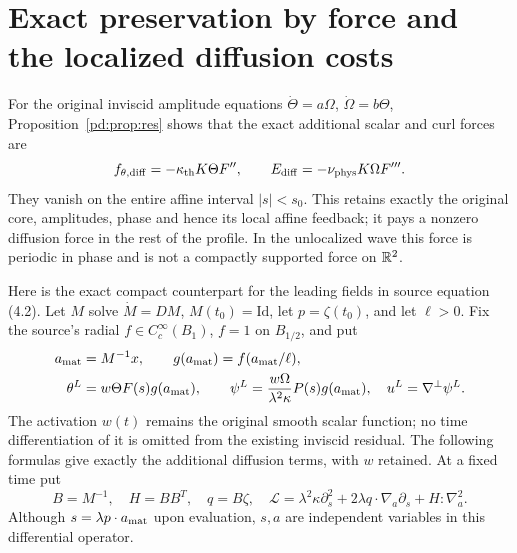 \section{Exact preservation by force and the localized diffusion costs}

For the original inviscid amplitude equations $\dot\Theta=a\Omega$,
$\dot\Omega=b\Theta$, Proposition~\ref{pd:prop:res} shows that the exact
additional scalar and curl forces are
\begin{equation}\label{pd:eq:repair}
 f_{\theta,\mathrm{diff}}=-\kappa_{\rm th} K\Theta F'',\qquad
 E_{\mathrm{diff}}=-\nu_{\rm phys} K\Omega F'''.
\end{equation}
They vanish on the entire affine interval $|s|<s_0$. This retains exactly
the original core, amplitudes, phase and hence its local affine feedback;
it pays a nonzero diffusion force in the rest of the profile. In the
unlocalized wave this force is periodic in phase and is not a compactly
supported force on $\mathbb R^2$.

Here is the exact compact counterpart for the leading fields in source
equation (4.2). Let $M$ solve $\dot M=DM$, $M(t_0)=\mathrm{Id}$, let
$p=\zeta(t_0)$, and let $\ell>0$. Fix the source's radial
$f\in C_c^\infty(B_1)$, $f=1$ on $B_{1/2}$, and put
\begin{align}\label{pd:eq:localized}
 a_{\rm mat}&=M^{-1}x,\qquad g(a_{\rm mat})=f(a_{\rm mat}/\ell),\notag\\
 \theta^L&=w\Theta F(s)g(a_{\rm mat}),\qquad
 \psi^L=\frac{w\Omega}{\lambda^2\kappa}P(s)g(a_{\rm mat}),\quad
 u^L=\nabla^\perp\psi^L.
\end{align}
The activation $w(t)$ remains the original smooth scalar function; no
time differentiation of it is omitted from the existing inviscid
residual. The following formulas give exactly the additional diffusion
terms, with $w$ retained.
At a fixed time put
\begin{equation}\label{pd:eq:L}
 B=M^{-1},\quad H=BB^T,\quad q=B\zeta,\quad
 \mathscr L=\lambda^2\kappa\partial_s^2+
            2\lambda q\cdot\nabla_a\partial_s+H:\nabla_a^2.
\end{equation}
Although $s=\lambda p\cdot a_{\rm mat}$ upon evaluation, $s,a$ are
independent variables in this differential operator.

